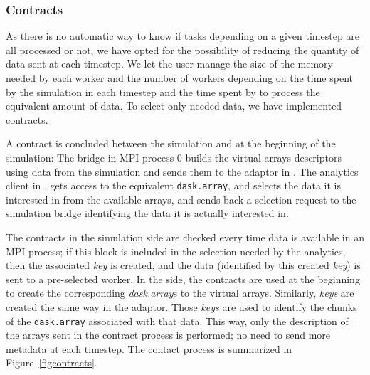 \subsubsection{Contracts}\label{sec:contracts}
As there is no automatic way to know if tasks depending on a given timestep are all processed or not, we have opted for the possibility of reducing the quantity of data sent at each timestep. We let the user manage the size of the memory needed by each worker and the number of workers depending on the time spent by the simulation in each timestep and the time spent by \dask to process the equivalent amount of data. To select only needed data, we have implemented contracts.

A contract is concluded between the simulation and \dask at the beginning of the simulation: The bridge in MPI process $0$ builds the \deisa virtual arrays descriptors using data from the simulation and sends them to the adaptor in \dask. The analytics client in \dask, gets access to the equivalent \texttt{dask.array}, and selects the data it is interested in from the available arrays, and sends back a selection request to the simulation bridge identifying the data it is actually interested in.

The contracts in the simulation side are checked every time data is available in an MPI process; if this block is included in the selection needed by the analytics, then the associated \textit{key} is created, and the data (identified by this created \textit{key}) is sent to a pre-selected worker. In the \dask side, the contracts are used at the beginning to create the corresponding \textit{dask.array}s to the \deisa virtual arrays. Similarly, \textit{keys} are created the same way in the adaptor. Those \textit{keys} are used to identify the chunks of the \texttt{dask.array} associated with that data. This way, only the description of the arrays sent in the contract process is performed; no need to send more metadata at each timestep. The contact process is summarized in Figure~\ref{figcontracts}.

